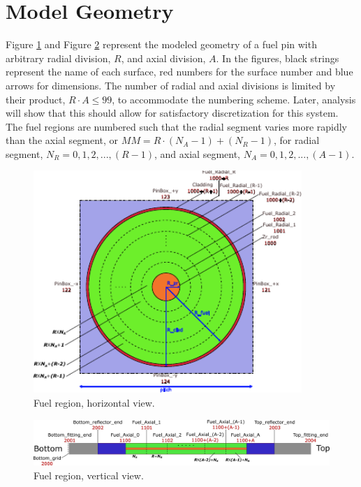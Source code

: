 \documentclass{UWNR_modeling}
\begin{document}
\section{Model Geometry}\label{section:geometry}
Figure \ref{fig:fuel_xy} and Figure \ref{fig:fuel_yz} represent the modeled geometry of a fuel pin with arbitrary radial division, $R$, and axial division, $A$. In the figures, black strings represent the name of each surface, red numbers for the surface number and blue arrows for dimensions.  The number of radial and axial divisions is limited by their product, $R \cdot A \leq 99$, to accommodate the numbering scheme.  Later, analysis will show that this should allow for satisfactory discretization for this system. The fuel regions are numbered such that the radial segment varies more rapidly than the axial segment, or $MM = R\cdot(N_A-1) + (N_R-1)$, for radial segment, $N_R = 0, 1, 2, ..., (R-1)$, and axial segment, $N_A = 0, 1, 2, ..., (A-1)$.

\begin{figure}[H]
  \centering
  \includegraphics[width=4in]{fuel_xy.pdf}
  \caption{Fuel region, horizontal view.}
  \label{fig:fuel_xy}
\end{figure}

\begin{figure}[H]
  \centering
  \includegraphics[width=7in]{fuel_yz.pdf}
  \caption{Fuel region, vertical view.}
  \label{fig:fuel_yz}
\end{figure}
\end{document}
